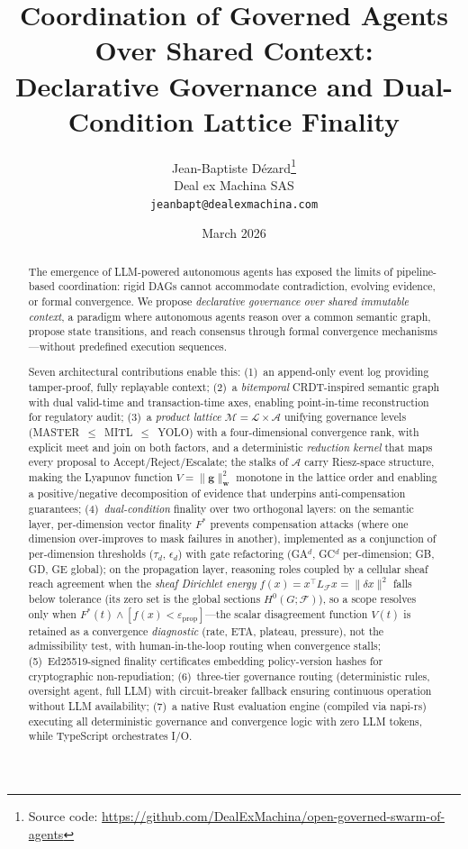 \documentclass[11pt]{article}
\title{Coordination of Governed Agents Over Shared Context:\\Declarative Governance and Dual-Condition Lattice Finality}
\author{
  Jean-Baptiste D\'ezard\thanks{Source code: \url{https://github.com/DealExMachina/open-governed-swarm-of-agents}}\\
  Deal ex Machina SAS\\
  \texttt{jeanbapt@dealexmachina.com}
}
\date{March 2026}
\begin{document}
\setlength{\emergencystretch}{2em}
\sloppy

\maketitle

\begin{abstract}
The emergence of LLM-powered autonomous agents has exposed the limits of pipeline-based coordination: rigid DAGs cannot accommodate contradiction, evolving evidence, or formal convergence. We propose \emph{declarative governance over shared immutable context}, a paradigm where autonomous agents reason over a common semantic graph, propose state transitions, and reach consensus through formal convergence mechanisms---without predefined execution sequences.

Seven architectural contributions enable this: (1)~an append-only event log providing tamper-proof, fully replayable context; (2)~a \emph{bitemporal} CRDT-inspired semantic graph with dual valid-time and transaction-time axes, enabling point-in-time reconstruction for regulatory audit; (3)~a \emph{product lattice} $\mathcal{M} = \mathcal{L} \times \mathcal{A}$ unifying governance levels (MASTER~$\leq$~MITL~$\leq$~YOLO) with a four-dimensional convergence rank, with explicit meet and join on both factors, and a deterministic \emph{reduction kernel} that maps every proposal to Accept/Reject/Escalate; the stalks of $\mathcal{A}$ carry Riesz-space structure, making the Lyapunov function $V = \|\mathbf{g}\|^2_\mathbf{w}$ monotone in the lattice order and enabling a positive/negative decomposition of evidence that underpins anti-compensation guarantees; (4)~\emph{dual-condition} finality over two orthogonal layers: on the semantic layer, per-dimension vector finality $F^*$ prevents compensation attacks (where one dimension over-improves to mask failures in another), implemented as a conjunction of per-dimension thresholds ($\tau_d$, $\epsilon_d$) with gate refactoring (GA$^d$, GC$^d$ per-dimension; GB, GD, GE global); on the propagation layer, reasoning roles coupled by a cellular sheaf reach agreement when the \emph{sheaf Dirichlet energy} $f(x) = x^\top L_{\mathcal{F}} x = \|\delta x\|^2$ falls below tolerance (its zero set is the global sections $H^0(G;\mathcal{F})$), so a scope resolves only when $F^*(t) \wedge [f(x) < \varepsilon_{\mathrm{prop}}]$---the scalar disagreement function $V(t)$ is retained as a convergence \emph{diagnostic} (rate, ETA, plateau, pressure), not the admissibility test, with human-in-the-loop routing when convergence stalls; (5)~Ed25519-signed finality certificates embedding policy-version hashes for cryptographic non-repudiation; (6)~three-tier governance routing (deterministic rules, oversight agent, full LLM) with circuit-breaker fallback ensuring continuous operation without LLM availability; (7)~a native Rust evaluation engine (compiled via napi-rs) executing all deterministic governance and convergence logic with zero LLM tokens, while TypeScript orchestrates I/O.


\end{abstract}
\end{document}
